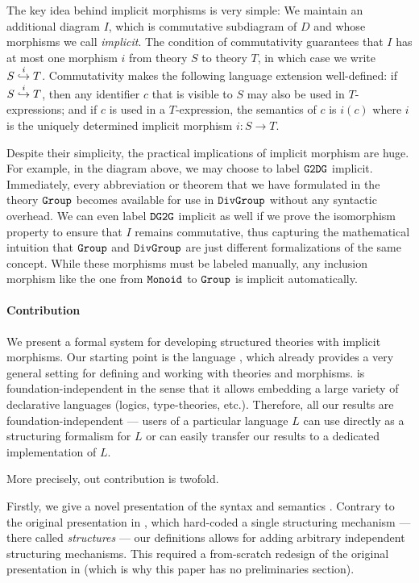 The key idea behind implicit morphisms is very simple:
We maintain an additional diagram $I$, which is commutative subdiagram of $D$ and whose morphisms we call \emph{implicit}.
The condition of commutativity guarantees that $I$ has at most one morphism $i$ from theory $S$ to theory $T$, in which case we write $\ipc{i}{S}{T}$.
Commutativity makes the following language extension well-defined: if $\ipc{i}{S}{T}$, then any identifier $c$ that is visible to $S$ may also be used in $T$-expressions; and if $c$ is used in a $T$-expression, the semantics of $c$ is $i(c)$ where $i$ is the uniquely determined implicit morphism $i:S\to T$.

Despite their simplicity, the practical implications of implicit morphism are huge.
For example, in the diagram above, we may choose to label $\cn{G2DG}$ implicit.
Immediately, every abbreviation or theorem that we have formulated in the theory $\cn{Group}$ becomes available for use in $\cn{DivGroup}$ without any syntactic overhead.
We can even label $\cn{DG2G}$ implicit as well if we prove the isomorphism property to ensure that $I$ remains commutative, thus capturing the mathematical intuition that $\cn{Group}$ and $\cn{DivGroup}$ are just different formalizations of the same concept.
While these morphisms must be labeled manually, any inclusion morphism like the one from $\cn{Monoid}$ to $\cn{Group}$ is implicit automatically.

\paragraph{Contribution}
We present a formal system for developing structured theories with implicit morphisms.
Our starting point is the \mmt language \cite{RK:mmt:10}, which already provides a very general setting for defining and working with theories and morphisms.
\mmt is foundation-independent in the sense that it allows embedding a large variety of declarative languages (logics, type-theories, etc.).
Therefore, all our results are foundation-independent --- users of a particular language $L$ can use \mmt directly as a structuring formalism for $L$ or can easily transfer our results to a dedicated implementation of $L$.

More precisely, out contribution is twofold.

Firstly, we give a novel presentation of the syntax and semantics \mmt.
Contrary to the original presentation in \cite{RK:mmt:10}, which hard-coded a single structuring mechanism --- there called \textit{structures} --- our definitions allows for adding arbitrary independent structuring mechanisms.
This required a from-scratch redesign of the original presentation in \cite{RK:mmt:10} (which is why this paper has no preliminaries section).

